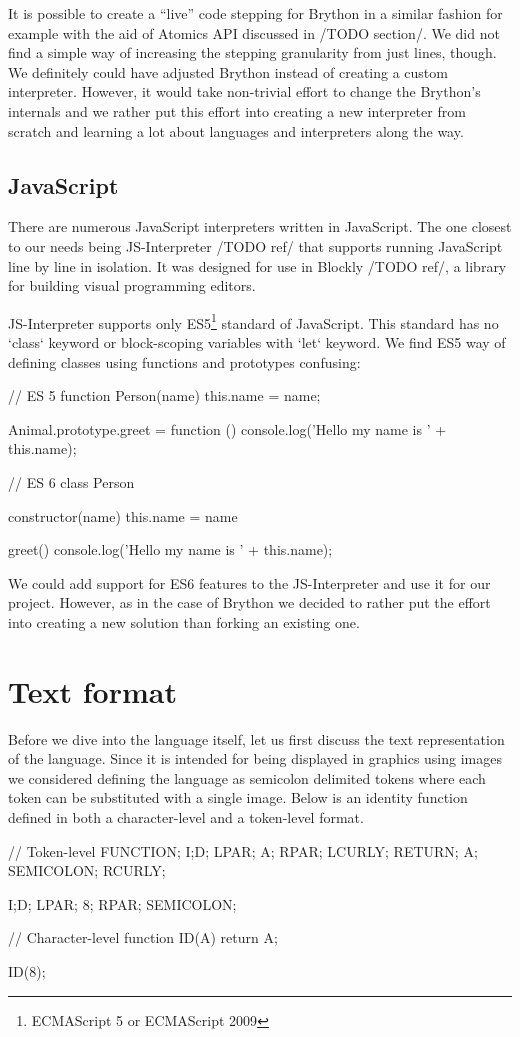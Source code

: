 It is possible to create a ``live'' code stepping for Brython in a similar fashion for example with the aid of Atomics API discussed in /TODO section/.
We did not find a simple way of increasing the stepping granularity from just lines, though. We definitely could have adjusted Brython instead
of creating a custom interpreter. However, it would take non-trivial effort to change the Brython's internals and we rather put this effort into creating
a new interpreter from scratch and learning a lot about languages and interpreters along the way.

\subsection{JavaScript}
There are numerous JavaScript interpreters written in JavaScript. The one closest to our needs being JS-Interpreter /TODO ref/ that supports running JavaScript
line by line in isolation. It was designed for use in Blockly /TODO ref/, a library for building visual programming editors.

JS-Interpreter supports only ES5\footnote{ECMAScript 5 or ECMAScript 2009} standard of JavaScript. This standard has no `class` keyword or block-scoping variables
with `let` keyword. We find ES5 way of defining classes using functions and prototypes confusing:
\begin{code}
// ES 5
function Person(name) {
    this.name = name;  
}

Animal.prototype.greet = function () {
    console.log('Hello my name is ' + this.name);
}

// ES 6
class Person {
    constructor(name) {
        this.name = name
    }

    greet() {
        console.log('Hello my name is ' + this.name);
    }
}
\end{code}

We could add support for ES6 features to the JS-Interpreter and use it for our project. However, as in the case of Brython we decided to rather put the effort into
creating a new solution than forking an existing one.

\section{Text format}
Before we dive into the language itself, let us first discuss the text representation of the language. Since it is intended for being displayed in
graphics using images we considered defining the language as semicolon delimited tokens where each token can be substituted with a single image.
Below is an identity function defined in both a character-level and a token-level format.
\begin{code}
// Token-level
FUNCTION; I;D; LPAR; A; RPAR; LCURLY;
RETURN; A; SEMICOLON;
RCURLY;

I;D; LPAR; 8; RPAR; SEMICOLON;

// Character-level
function ID(A) {
    return A;
}

ID(8);
\end{code}

